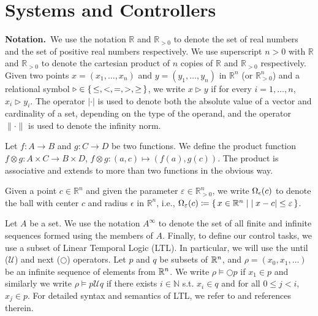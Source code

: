 
\section{Systems and Controllers}

\smallskip
\noindent\textbf{Notation.}\
We use the notation $\mathbb{R}$ and $\mathbb{R}_{>0}$ to denote the set of real numbers and the set of positive real numbers respectively.
We use superscript $n>0$ with $\mathbb{R}$ and $\mathbb{R}_{>0}$ to denote the cartesian product of $n$ copies of $\mathbb{R}$ and $\mathbb{R}_{>0}$ respectively.
Given two points $x=(x_1,\ldots, x_n)$ and $y=(y_1,\ldots, y_n)$ in $ \mathbb{R}^n$ (or $\mathbb{R}^n_{>0}$) and a relational symbol $\triangleright\in \set{\leq, <, = , >, \geq}$, we write $x\triangleright y$ if for every $i=1,\ldots,n$, $x_i\triangleright y_i$.
The operator $|\cdot |$ is used to denote both the absolute value of a vector and cardinality of a set, depending on the type of the operand, and the operator $\| \cdot \|$ is used to denote the infinity norm.  

Let $f\colon A\to B$ and $g\colon C\to D$ be two functions.
We define the product function $f\otimes g\colon A\times C\to B\times D $, $f\otimes g \colon (a,c)\mapsto (f(a),g(c))$.
The product is associative and extends to more than two functions in the obvious way.

Given a point $c\in \mathbb{R}^n$ and given the parameter $\varepsilon\in \mathbb{R}_{>0}^{n}$, we write $\Omega_\epsilon(c)$ to denote the ball with center $c$ and radius $\epsilon$ in $\mathbb{R}^n$, i.e., 
$\Omega_\varepsilon(c)\coloneqq \set{x \in \mathbb{R}^n \mid  |x-c|\leq \varepsilon }$.

Let $A$ be a set.
We use the notation $A^\infty$ to denote the set of all finite and infinite sequences formed using the members of $A$. 
Finally, to define our control tasks, we use a subset of Linear Temporal Logic (LTL). 
In particular, we will use the until ($\mathcal{U}$) and next  ($\bigcirc$) operators. 
Let $p$ and $q$ be subsets of $\mathbb{R}^n$, and $\rho=(x_0,x_1,\dots)$ be an infinite sequence of elements from $\mathbb{R}^n$. 
We write $\rho\models\bigcirc p$ if $x_1\in p$ and similarly we write $\rho\models p\mathcal{U}q$ if there exists 
$i\in\mathbb{N}$ s.t. $x_i\in q$ and for all $0\leq j<i$, $x_j\in p$. 
For detailed syntax and semantics of LTL, we refer to \cite{baier2008principles} and references therein.

